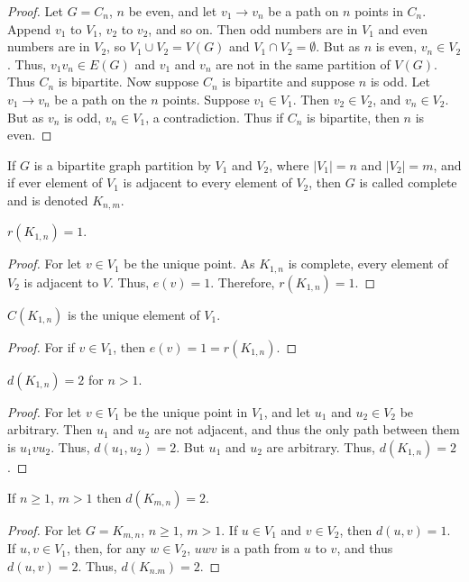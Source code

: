 \documentclass[crop=false,class=book]{standalone}
\begin{document}
\begin{proof}
Let $G=C_n$, $n$ be even, and let $v_1\rightarrow v_n$ be a path on $n$ points in $C_n$. Append $v_1$ to $V_1$, $v_2$ to $v_2$, and so on. Then odd numbers are in $V_1$ and even numbers are in $V_2$, so $V_1\cup V_2 = V(G)$ and $V_1 \cap V_2 = \emptyset$. But as $n$ is even, $v_n \in V_2$. Thus, $v_1 v_n \in E(G)$ and $v_1$ and $v_n$ are not in the same partition of $V(G)$. Thus $C_n$ is bipartite. Now suppose $C_n$ is bipartite and suppose $n$ is odd. Let $v_1 \rightarrow v_n$ be a path on the $n$ points. Suppose $v_1 \in V_1$. Then $v_2 \in V_2$, and $v_n \in V_2$. But as $v_n$ is odd, $v_{n} \in V_1$, a contradiction. Thus if $C_n$ is bipartite, then $n$ is even.
\end{proof}
\begin{definition}
If $G$ is a bipartite graph partition by $V_1$ and $V_2$, where $|V_1| = n$ and $|V_2| = m$, and if ever element of $V_1$ is adjacent to every element of $V_2$, then $G$ is called complete and is denoted $K_{n,m}$.
\end{definition}
\begin{corollary}
$r(K_{1,n}) = 1$.
\end{corollary}
\begin{proof}
For let $v\in V_1$ be the unique point. As $K_{1,n}$ is complete, every element of $V_2$ is adjacent to $V$. Thus, $e(v) = 1$. Therefore, $r(K_{1,n}) =1$.
\end{proof}
\begin{corollary}
$C(K_{1,n})$ is the unique element of $V_1$.
\end{corollary}
\begin{proof}
For if $v\in V_1$, then $e(v) = 1 = r(K_{1,n})$.
\end{proof}
\begin{corollary}
$d(K_{1,n})=2$ for $n>1$.
\end{corollary}
\begin{proof}
For let $v\in V_1$ be the unique point in $V_1$, and let $u_1$ and $u_2 \in V_2$ be arbitrary. Then $u_1$ and $u_2$ are not adjacent, and thus the only path between them is $u_1 v u_2$. Thus, $d(u_1,u_2) = 2$. But $u_1$ and $u_2$ are arbitrary. Thus, $d(K_{1,n}) = 2$.
\end{proof}
\begin{corollary}
If $n\geq1$, $m> 1$ then $d(K_{m,n}) = 2$.
\end{corollary}
\begin{proof}
For let $G=K_{m,n}$, $n\geq1$, $m> 1$. If $u\in V_1$ and $v\in V_2$, then $d(u,v) = 1$. If $u,v\in V_1$, then, for any $w\in V_2$, $uwv$ is a path from $u$ to $v$, and thus $d(u,v) = 2$. Thus, $d(K_{n.m}) = 2$.
\end{proof}
\end{document}

